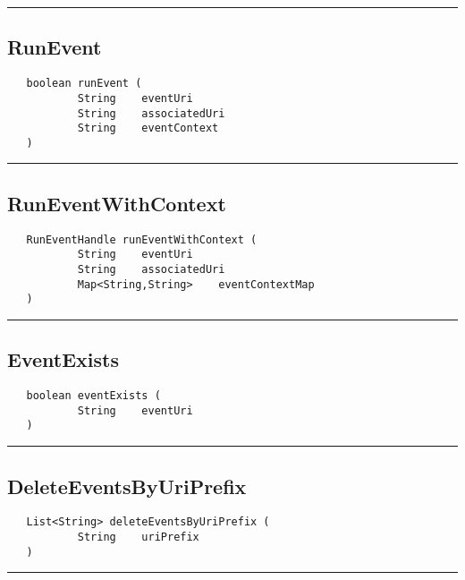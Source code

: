 \rule{15cm}{2pt}
\subsection{RunEvent}
\label{Api:RunEvent}
\begin{verbatim}
   boolean runEvent (
           String    eventUri
           String    associatedUri
           String    eventContext
   )
\end{verbatim}



\rule{15cm}{2pt}
\subsection{RunEventWithContext}
\label{Api:RunEventWithContext}
\begin{verbatim}
   RunEventHandle runEventWithContext (
           String    eventUri
           String    associatedUri
           Map<String,String>    eventContextMap
   )
\end{verbatim}



\rule{15cm}{2pt}
\subsection{EventExists}
\label{Api:EventExists}
\begin{verbatim}
   boolean eventExists (
           String    eventUri
   )
\end{verbatim}



\rule{15cm}{2pt}
\subsection{DeleteEventsByUriPrefix}
\label{Api:DeleteEventsByUriPrefix}
\begin{verbatim}
   List<String> deleteEventsByUriPrefix (
           String    uriPrefix
   )
\end{verbatim}



\rule{15cm}{2pt}
